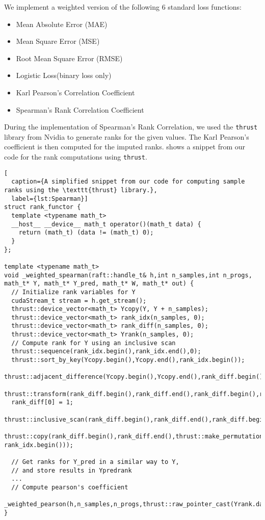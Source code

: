 We implement a weighted version of the following $6$ standard loss functions:

\begin{itemize}
  \item Mean Absolute Error (MAE)
  \item Mean Square Error (MSE)
  \item Root Mean Square Error (RMSE)
  \item Logistic Loss(binary loss only)
  \item Karl Pearson's Correlation Coefficient
  \item Spearman's Rank Correlation Coefficient
\end{itemize}


During the implementation of Spearman's Rank Correlation, we used the \texttt{thrust} library from Nvidia to generate ranks for the given values. The Karl Pearson's coefficient is then computed for the imputed ranks.  shows a snippet from our code for the rank computations using \texttt{thrust}. 

\begin{lstlisting}[
  caption={A simplified snippet from our code for computing sample ranks using the \texttt{thrust} library.},
  label={lst:Spearman}]
struct rank_functor {
  template <typename math_t>
  __host__ __device__ math_t operator()(math_t data) {
    return (math_t) (data != (math_t) 0);
  }
};

template <typename math_t>
void _weighted_spearman(raft::handle_t& h,int n_samples,int n_progs, math_t* Y, math_t* Y_pred, math_t* W, math_t* out) {
  // Initialize rank variables for Y
  cudaStream_t stream = h.get_stream();
  thrust::device_vector<math_t> Ycopy(Y, Y + n_samples);
  thrust::device_vector<math_t> rank_idx(n_samples, 0);
  thrust::device_vector<math_t> rank_diff(n_samples, 0);
  thrust::device_vector<math_t> Yrank(n_samples, 0);
  // Compute rank for Y using an inclusive scan
  thrust::sequence(rank_idx.begin(),rank_idx.end(),0);
  thrust::sort_by_key(Ycopy.begin(),Ycopy.end(),rank_idx.begin());
  thrust::adjacent_difference(Ycopy.begin(),Ycopy.end(),rank_diff.begin());
  thrust::transform(rank_diff.begin(),rank_diff.end(),rank_diff.begin(),rank_functor());
  rank_diff[0] = 1;
  thrust::inclusive_scan(rank_diff.begin(),rank_diff.end(),rank_diff.begin());
  thrust::copy(rank_diff.begin(),rank_diff.end(),thrust::make_permutation_iterator(Yrank.begin(), rank_idx.begin()));

  // Get ranks for Y_pred in a similar way to Y,
  // and store results in Ypredrank
  ...
  // Compute pearson's coefficient
  _weighted_pearson(h,n_samples,n_progs,thrust::raw_pointer_cast(Yrank.data()),thrust::raw_pointer_cast(Ypredrank.data()),W,out);
}

\end{lstlisting}

